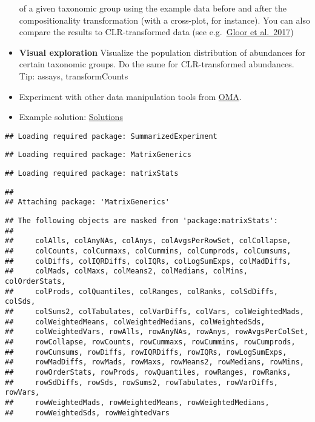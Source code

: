 \documentclass[
  oneside]{book}
\begin{document}
\begin{itemize}
  of a given taxonomic group using the example data before and after
  the compositionality transformation (with a cross-plot, for
  instance). You can also compare the results to CLR-transformed data
  (see e.g.~\href{https://www.frontiersin.org/articles/10.3389/fmicb.2017.02224/full}{Gloor et
  al.~2017})
\item
  \textbf{Visual exploration} Visualize the population distribution of
  abundances for certain taxonomic groups. Do the same for
  CLR-transformed abundances. Tip: assays, transformCounts
\item
  Experiment with other data manipulation tools from
  \href{https://microbiome.github.io/OMA/taxonomic-information.html\#functions-to-access-taxonomic-information}{OMA}.
\item
  Example solution: \href{06-3-ex-sol-ADHD.html}{Solutions}
\end{itemize}

\begin{verbatim}
## Loading required package: SummarizedExperiment
\end{verbatim}

\begin{verbatim}
## Loading required package: MatrixGenerics
\end{verbatim}

\begin{verbatim}
## Loading required package: matrixStats
\end{verbatim}

\begin{verbatim}
## 
## Attaching package: 'MatrixGenerics'
\end{verbatim}

\begin{verbatim}
## The following objects are masked from 'package:matrixStats':
## 
##     colAlls, colAnyNAs, colAnys, colAvgsPerRowSet, colCollapse,
##     colCounts, colCummaxs, colCummins, colCumprods, colCumsums,
##     colDiffs, colIQRDiffs, colIQRs, colLogSumExps, colMadDiffs,
##     colMads, colMaxs, colMeans2, colMedians, colMins, colOrderStats,
##     colProds, colQuantiles, colRanges, colRanks, colSdDiffs, colSds,
##     colSums2, colTabulates, colVarDiffs, colVars, colWeightedMads,
##     colWeightedMeans, colWeightedMedians, colWeightedSds,
##     colWeightedVars, rowAlls, rowAnyNAs, rowAnys, rowAvgsPerColSet,
##     rowCollapse, rowCounts, rowCummaxs, rowCummins, rowCumprods,
##     rowCumsums, rowDiffs, rowIQRDiffs, rowIQRs, rowLogSumExps,
##     rowMadDiffs, rowMads, rowMaxs, rowMeans2, rowMedians, rowMins,
##     rowOrderStats, rowProds, rowQuantiles, rowRanges, rowRanks,
##     rowSdDiffs, rowSds, rowSums2, rowTabulates, rowVarDiffs, rowVars,
##     rowWeightedMads, rowWeightedMeans, rowWeightedMedians,
##     rowWeightedSds, rowWeightedVars
\end{verbatim}
\end{document}
